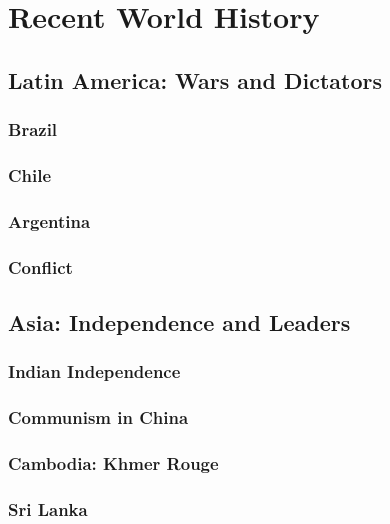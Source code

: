 \chapter{Recent World History}

\section{Latin America: Wars and Dictators}

\subsection*{Brazil}

\subsection*{Chile}

\subsection*{Argentina}

\subsection*{Conflict}

\section{Asia: Independence and Leaders}

\subsection*{Indian Independence}

\subsection*{Communism in China}

\subsection*{Cambodia: Khmer Rouge}

\subsection*{Sri Lanka}

